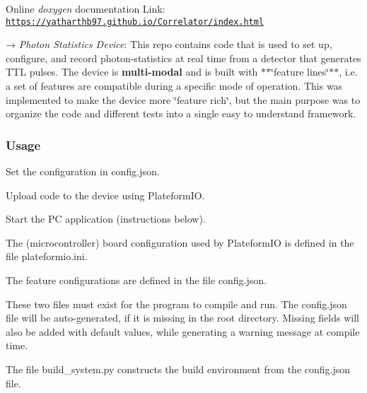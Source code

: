 



Online {\itshape doxygen} documentation Link\+: \href{https://yatharthb97.github.io/Correlator/index.html}{\tt https\+://yatharthb97.\+github.\+io/\+Correlator/index.\+html} 



→ {\itshape Photon Statistics Device}\+: This repo contains code that is used to set up, configure, and record photon-\/statistics at real time from a detector that generates T\+TL pulses. The device is {\bfseries multi-\/modal} and is built with $\ast$$\ast$\char`\"{}feature lines\char`\"{}$\ast$$\ast$, i.\+e. a set of features are compatible during a specific mode of operation. This was implemented to make the device more \char`\"{}feature rich\char`\"{}, but the main purpose was to organize the code and different tests into a single easy to understand framework.

\subsubsection*{Usage}


\begin{DoxyEnumerate}
\item Set the configuration in {\ttfamily config.\+json}.
\item Upload code to the device using Plateform\+IO.
\item Start the PC application (instructions below). 


\end{DoxyEnumerate}
\begin{DoxyItemize}
\item The (microcontroller) board configuration used by Plateform\+IO is defined in the file {\ttfamily plateformio.\+ini}.
\item The feature configurations are defined in the file {\ttfamily config.\+json}.
\item These two files must exist for the program to compile and run. The {\ttfamily config.\+json} file will be auto-\/generated, if it is missing in the root directory. Missing fields will also be added with default values, while generating a warning message at compile time. 


\item The file {\ttfamily build\+\_\+system.\+py} constructs the build environment from the {\ttfamily config.\+json} file.
\end{DoxyItemize}

